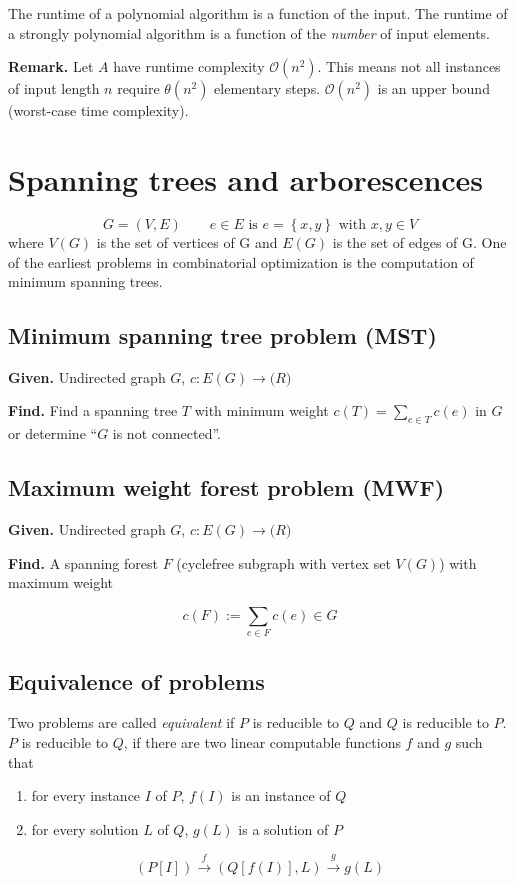 \documentclass{article}
\newcommand{\set}[1]{\left\{#1\right\}}
\newcommand{\given}[1]{\textbf{Given.} #1\par}
\newcommand{\find}[1]{\textbf{Find.} #1\par}
\begin{document}
The runtime of a polynomial algorithm is a function of the input. The runtime of a strongly polynomial algorithm is a function of the \emph{number} of input elements.

\textbf{Remark.} Let $A$ have runtime complexity $\mathcal{O}(n^2)$. This means not all instances of input length $n$ require $\mathcal{\theta}(n^2)$ elementary steps. $\mathcal{O}(n^2)$ is an upper bound (worst-case time complexity).

\section{Spanning trees and arborescences}
%
\[
  G = (V, E) \qquad e \in E \text{ is } e = \set{x, y} \text{ with } x, y \in V
\]
where $V(G)$ is the set of vertices of G and $E(G)$ is the set of edges of G. One of the earliest problems in combinatorial optimization is the computation of minimum spanning trees.

\subsection{Minimum spanning tree problem (MST)}
%
\given{Undirected graph $G$, $c: E(G) \rightarrow \mathbb(R)$}
\find{Find a spanning tree $T$ with minimum weight $c(T) = \sum_{e \in T} c(e)$ in $G$ or determine ``$G$ is not connected''.}

\subsection{Maximum weight forest problem (MWF)}
%
\given{Undirected graph $G$, $c: E(G) \rightarrow \mathbb(R)$}
\find{A spanning forest $F$ (cyclefree subgraph with vertex set $V(G)$) with maximum weight}
\[
  c(F) := \sum_{e \in F} c(e) \in G
\]

\subsection{Equivalence of problems}
%
Two problems are called \emph{equivalent} if $P$ is reducible to $Q$ and $Q$ is reducible to $P$. $P$ is reducible to $Q$, if there are two linear computable functions $f$ and $g$ such that
\begin{enumerate}
  \item for every instance $I$ of $P$, $f(I)$ is an instance of $Q$
  \item for every solution $L$ of $Q$, $g(L)$ is a solution of $P$
\end{enumerate}
\[
  (P[I]) \xrightarrow{f} (Q[f(I)], L) \xrightarrow{g} g(L)
\]
\end{document}
